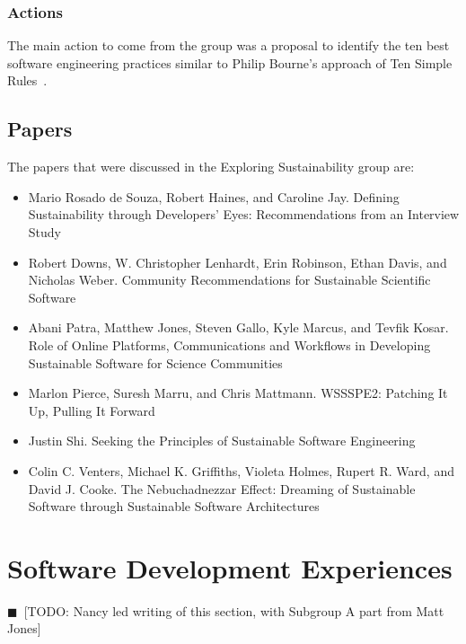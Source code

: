 \documentclass[11pt, oneside]{amsart}
\newcommand{\todo}[1]{{\color{blue}$\blacksquare$~\textsf{[TODO: #1]}}}
\begin{document}
\subsubsection{Actions}

The main action to come from the group was a proposal to identify the ten best software engineering practices
similar to Philip Bourne's approach of Ten Simple Rules~\cite{bourne-ten-simple-rules}.

\subsection{Papers}
The papers that were discussed in the Exploring Sustainability group are:
\begin{itemize}
\item Mario Rosado de Souza, Robert Haines, and Caroline Jay. Defining
Sustainability through Developers' Eyes: Recommendations from an Interview
Study~\cite{wssspe2_rosada_de_souza}

\item Robert Downs, W. Christopher Lenhardt, Erin Robinson, Ethan Davis, and
Nicholas Weber. Community Recommendations for Sustainable Scientific
Software~\cite{wssspe2_downs}

\item Abani Patra, Matthew Jones, Steven Gallo, Kyle Marcus, and Tevfik Kosar.
Role of Online Platforms, Communications and Workflows in Developing Sustainable
Software for Science Communities~\cite{wssspe2_patra}

\item Marlon Pierce, Suresh Marru, and Chris Mattmann. {WSSSPE2}: Patching It Up,
Pulling It Forward~\cite{wssspe2_pierce}

\item Justin Shi. Seeking the Principles of Sustainable Software
Engineering~\cite{wssspe2_shi}

\item Colin C. Venters, Michael K. Griffiths, Violeta Holmes, Rupert R. Ward, and
David J. Cooke. The Nebuchadnezzar Effect: Dreaming of Sustainable Software
through Sustainable Software Architectures~\cite{wssspe2_venters}
\end{itemize}

\section{Software Development Experiences} \label{sec:devel}
\todo{Nancy led writing of this section, with Subgroup A part from Matt Jones}
\end{document}
